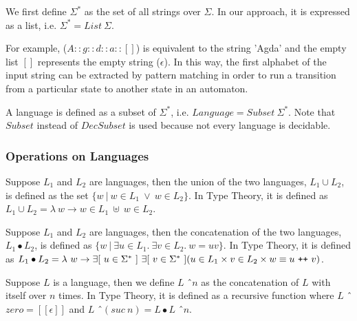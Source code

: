 \begin{defn}
\noindent We first define \(\Sigma^*\) as the set of all
strings over \(\Sigma\). In our approach, it is expressed as a list, i.e. \(\Sigma^* = List\ \Sigma\). 
\end{defn}

\par For example, (\(A :: g :: d :: a :: []\)) is equivalent to the string 'Agda' and the empty list \([]\)
represents the empty string (\(\epsilon\)). In this way, the first
alphabet of the input string can be extracted by pattern matching in order to
run a transition from a particular state to another state in an automaton. 

\begin{defn}
\noindent A language is defined as a subset of 
\(\Sigma^*\), i.e. \(Language = Subset\ \Sigma^*\). 
Note that \(Subset\) instead of \(DecSubset\) is used because not
every language is decidable. 
\end{defn}

\subsubsection{Operations on Languages}

\begin{defn} 
\noindent Suppose \(L_1\) and \(L_2\) are languages, then the union of
the two languages, \(L_1\cup L_2\), is defined as the set \(\{w\
|\  w \in L_1\ \vee \ w \in L_2\}\). In Type Theory, it is defined as \(L_1 \cup L_2 = \lambda\ w
\to w \in L_1\ \uplus\ w \in L_2\).
\end{defn}

\begin{defn}
\noindent Suppose \(L_1\) and \(L_2\) are languages, then
the concatenation of the two languages, \(L_1\bullet L_2\), is defined
as \(\{w\  |\  \exists u\in L_1.\ \exists v\in L_2.\ w = uv\}\). In
Type Theory, it is defined as \(L_1\bullet L_2 = \lambda\ w \to \exists[\
u \in \Sigma^*\ ]\ \exists[\ v \in \Sigma^*\ ] (u \in L_1 \times v \in
L_2 \times w \equiv u\ \texttt{+}\texttt{+}\  v )\).
\end{defn}

\begin{defn}
\noindent Suppose \(L\) is a language, then we define \(L\) \^\ \(n\) as
the concatenation of \(L\) with itself over \(n\) times. In Type Theory,
it is defined as a recursive function where \(L\) \^\ \(zero = [\![\epsilon ]\!]\) and
\(L\) \^\ \((suc\ n) = L \bullet L\) \^\ \(n\). 
\end{defn}

